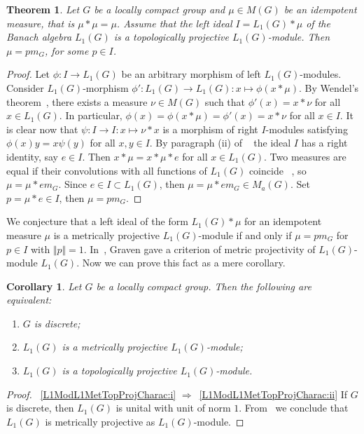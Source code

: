 \documentclass{article}
\theoremstyle{plain}
\newtheorem{theorem}{Theorem}[section]
\newtheorem{corollary}{Corollary}[section]
\theoremstyle{definition}
\newtheorem{proof}{Proof}\def\theproof{}
\newcommand{\convol}{\ast}
\begin{document}
\begin{fulltext}
\begin{theorem}\label{CommIdealByIdemMeasL1MetTopProjCharac} Let $G$ be a
locally compact group and  $\mu\in M(G)$ be an idempotent measure, that is
$\mu\convol\mu=\mu$. Assume that the left ideal $I=L_1(G)\convol\mu$ of the
Banach algebra $L_1(G)$ is a topologically projective $L_1(G)$-module. Then
$\mu=p m_G$, for some $p\in I$.
\end{theorem}
\begin{proof} Let $\phi:I\to L_1(G)$ be an arbitrary morphism of left
$L_1(G)$-modules. Consider $L_1(G)$-morphism $\phi':L_1(G)\to
L_1(G):x\mapsto\phi(x\convol\mu)$. By Wendel's theorem~\cite[theorem
1]{WendLeftCentrzrs}, there exists a measure $\nu\in M(G)$ such that
$\phi'(x)=x\convol\nu$ for all $x\in L_1(G)$. In particular,
$\phi(x)=\phi(x\convol\mu)=\phi'(x)=x\convol\nu$ for all $x\in I$. It is clear
now that $\psi:I\to I:x\mapsto\nu\convol x$ is a morphism of right $I$-modules
satisfying $\phi(x)y=x\psi(y)$ for all $x,y\in I$. By paragraph \textup{(ii)} of
~\cite[lemma 2]{NemMetTopProjIdBanAlg} the ideal $I$ has a right identity, say
$e\in I$. Then $x\convol\mu=x\convol\mu\convol e$ for all $x\in L_1(G)$. Two
measures are equal if their convolutions with all functions of $L_1(G)$ coincide
~\cite[corollary 3.3.24]{DalBanAlgAutCont}, so $\mu=\mu\convol e m_G$. Since
$e\in I\subset L_1(G)$, then $\mu=\mu\convol e m_G\in M_a(G)$. Set $p=\mu\convol
e\in I$, then $\mu=p m_G$.
\end{proof}

We conjecture that a left ideal of the form $L_1(G)\convol \mu$ for an
idempotent measure $\mu$ is a metrically projective $L_1(G)$-module if and only
if $\mu=p m_G$ for $p\in I$ with $\Vert p\Vert=1$. 
In~\cite[theorem 4.14]{GravInjProjBanMod}, Graven gave a criterion of 
metric projectivity of $L_1(G)$-module $L_1(G)$. Now we can prove this 
fact as a mere corollary.

\begin{corollary}\label{L1ModL1MetTopProjCharac} Let $G$ be a locally compact
group. Then the following are equivalent:
\begin{enumerate}[label = (\roman*)]
    \item $G$ is discrete;\label{L1ModL1MetTopProjCharac:i}
    
    \item $L_1(G)$ is a metrically projective 
    $L_1(G)$-module;\label{L1ModL1MetTopProjCharac:ii}
 
    \item $L_1(G)$ is a topologically projective 
    $L_1(G)$-module.\label{L1ModL1MetTopProjCharac:iii}
\end{enumerate}
\end{corollary}
\begin{proof} 
~\ref{L1ModL1MetTopProjCharac:i}
$\Longrightarrow$~\ref{L1ModL1MetTopProjCharac:ii} If $G$ is discrete, then
$L_1(G)$ is unital with unit of norm $1$. From~\cite[proposition
7]{NemMetTopProjIdBanAlg} we conclude that $L_1(G)$ is metrically projective as
$L_1(G)$-module.


\end{proof}
\end{fulltext}
\end{document}

